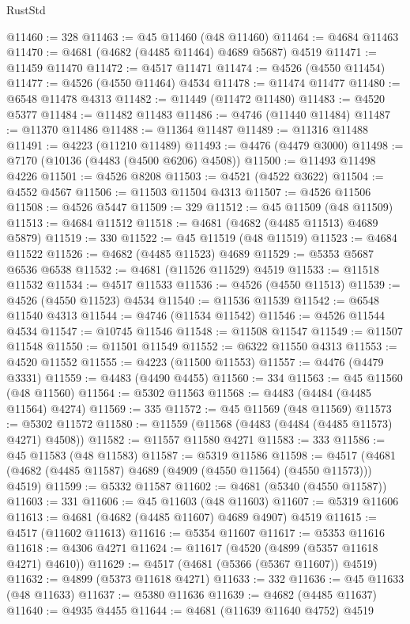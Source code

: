 \begin{lexlean}{RustStd}
\begin{coremodule}
@11460 := 328
@11463 := @45 @11460 (@48 @11460)
@11464 := @4684 @11463
@11470 := @4681 (@4682 (@4485 @11464) @4689 @5687) @4519
@11471 := @11459 @11470
@11472 := @4517 @11471
@11474 := @4526 (@4550 @11454)
@11477 := @4526 (@4550 @11464) @4534
@11478 := @11474 @11477
@11480 := @6548 @11478 @4313
@11482 := @11449 (@11472 @11480)
@11483 := @4520 @5377
@11484 := @11482 @11483
@11486 := @4746 (@11440 @11484)
@11487 := @11370 @11486
@11488 := @11364 @11487
@11489 := @11316 @11488
@11491 := @4223 (@11210 @11489)
@11493 := @4476 (@4479 @3000)
@11498 := @7170 (@10136 (@4483 (@4500 @6206) @4508))
@11500 := @11493 @11498 @4226
@11501 := @4526 @8208
@11503 := @4521 (@4522 @3622)
@11504 := @4552 @4567
@11506 := @11503 @11504 @4313
@11507 := @4526 @11506
@11508 := @4526 @5447
@11509 := 329
@11512 := @45 @11509 (@48 @11509)
@11513 := @4684 @11512
@11518 := @4681 (@4682 (@4485 @11513) @4689 @5879)
@11519 := 330
@11522 := @45 @11519 (@48 @11519)
@11523 := @4684 @11522
@11526 := @4682 (@4485 @11523) @4689
@11529 := @5353 @5687 @6536 @6538
@11532 := @4681 (@11526 @11529) @4519
@11533 := @11518 @11532
@11534 := @4517 @11533
@11536 := @4526 (@4550 @11513)
@11539 := @4526 (@4550 @11523) @4534
@11540 := @11536 @11539
@11542 := @6548 @11540 @4313
@11544 := @4746 (@11534 @11542)
@11546 := @4526 @11544 @4534
@11547 := @10745 @11546
@11548 := @11508 @11547
@11549 := @11507 @11548
@11550 := @11501 @11549
@11552 := @6322 @11550 @4313
@11553 := @4520 @11552
@11555 := @4223 (@11500 @11553)
@11557 := @4476 (@4479 @3331)
@11559 := @4483 (@4490 @4455)
@11560 := 334
@11563 := @45 @11560 (@48 @11560)
@11564 := @5302 @11563
@11568 := @4483 (@4484 (@4485 @11564) @4274)
@11569 := 335
@11572 := @45 @11569 (@48 @11569)
@11573 := @5302 @11572
@11580 := @11559 (@11568 (@4483 (@4484 (@4485 @11573) @4271) @4508))
@11582 := @11557 @11580 @4271
@11583 := 333
@11586 := @45 @11583 (@48 @11583)
@11587 := @5319 @11586
@11598 := @4517 (@4681 (@4682 (@4485 @11587) @4689 (@4909 (@4550 @11564) (@4550 @11573))) @4519)
@11599 := @5332 @11587
@11602 := @4681 (@5340 (@4550 @11587))
@11603 := 331
@11606 := @45 @11603 (@48 @11603)
@11607 := @5319 @11606
@11613 := @4681 (@4682 (@4485 @11607) @4689 @4907) @4519
@11615 := @4517 (@11602 @11613)
@11616 := @5354 @11607
@11617 := @5353 @11616
@11618 := @4306 @4271
@11624 := @11617 (@4520 (@4899 (@5357 @11618 @4271) @4610))
@11629 := @4517 (@4681 (@5366 (@5367 @11607)) @4519)
@11632 := @4899 (@5373 @11618 @4271)
@11633 := 332
@11636 := @45 @11633 (@48 @11633)
@11637 := @5380 @11636
@11639 := @4682 (@4485 @11637)
@11640 := @4935 @4455
@11644 := @4681 (@11639 @11640 @4752) @4519

\end{coremodule}
\end{lexlean}
